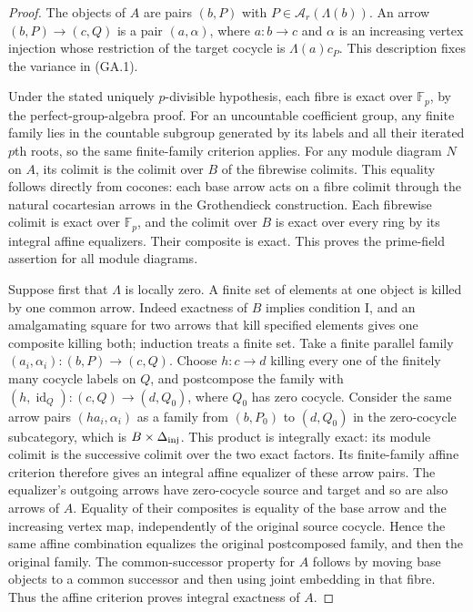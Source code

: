 \begin{proof}
The objects of $A$ are pairs $(b,P)$ with
$P\in\mathcal A_r(\Lambda(b))$. An arrow $(b,P)\to(c,Q)$ is a
pair $(a,\alpha)$, where $a:b\to c$ and $\alpha$ is an
increasing vertex injection whose restriction of the target
cocycle is $\Lambda(a)c_P$. This description fixes the variance in
(GA.1).

Under the stated uniquely $p$-divisible hypothesis, each fibre
is exact over $\mathbb F_p$, by the perfect-group-algebra proof.
For an uncountable coefficient group, any finite family lies in
the countable subgroup generated by its labels and all their
iterated $p$th roots, so the same finite-family criterion applies.
For any module
diagram $N$ on $A$, its colimit is the colimit over $B$ of the
fibrewise colimits. This equality follows directly from cocones:
each base arrow acts on a fibre colimit through the natural
cocartesian arrows in the Grothendieck construction. Each
fibrewise colimit is exact over $\mathbb F_p$, and the colimit
over $B$ is exact over every ring by its integral affine
equalizers. Their composite is exact. This proves the
prime-field assertion for all module diagrams.

Suppose first that $\Lambda$ is locally zero. A finite set of elements
at one object is killed by one common arrow. Indeed exactness
of $B$ implies condition I, and an amalgamating square for two
arrows that kill specified elements gives one composite killing
both; induction treats a finite set.
Take a finite parallel family $(a_i,\alpha_i):(b,P)\to(c,Q)$.
Choose $h:c\to d$ killing every one of the finitely many
cocycle labels on $Q$, and postcompose the family with
$(h,\operatorname{id}_Q):(c,Q)\to(d,Q_0)$, where $Q_0$
has zero cocycle. Consider the same arrow pairs
$(ha_i,\alpha_i)$ as a family from $(b,P_0)$ to $(d,Q_0)$
in the zero-cocycle subcategory, which is $B\times\Delta_{\rm inj}$.
This product is integrally exact: its module colimit is the
successive colimit over the two exact factors. Its finite-family
affine criterion therefore gives an integral affine equalizer
of these arrow pairs. The equalizer's outgoing arrows have
zero-cocycle source and target and so are also arrows of $A$.
Equality of their composites is equality of the base arrow
and the increasing vertex map, independently of the original
source cocycle. Hence the same affine combination equalizes
the original postcomposed family, and then the original family.
The common-successor property for $A$ follows by moving base
objects to a common successor and then using joint embedding
in that fibre. Thus the affine criterion proves integral
exactness of $A$.


\end{proof}
